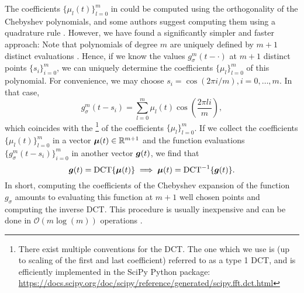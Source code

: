 The coefficients $\{\mu_l(t)\}_{l=0}^m$ in 
could be computed using the
orthogonality of the Chebyshev polynomials, and some authors suggest computing
them using a quadrature rule \cite[Algorithm~1]{lin2017randomized}. However, we
have found a significantly simpler and faster approach: Note that polynomials of
degree $m$ are uniquely defined by $m+1$ distinct evaluations \cite{gauss1799demonstratio}.
Hence, if we know the values $g_{\sigma}^m(t - \cdot)$ at $m+1$ distinct points 
$\{s_i\}_{i=0}^m$, we can uniquely determine the coefficients $\{\mu_l\}_{l=0}^m$
of this polynomial. For convenience, we may choose $s_i = \cos(2 \pi i/m), i=0,\dots,m$.
In that case,
\begin{equation}
    g_{\sigma}^m(t - s_i) = \sum_{l=0}^{m} \mu_l(t) \cos\left(\frac{2 \pi l i}{m}\right),
    \label{equ:2-chebyshev-chebyshev-nodes-evaluation}
\end{equation}
which coincides with the \footnote{There exist multiple conventions for the DCT.
The one which we use is (up to scaling of the first and last coefficient)
referred to as a type 1 DCT, and is efficiently implemented in the SciPy Python package:
\url{https://docs.scipy.org/doc/scipy/reference/generated/scipy.fft.dct.html}} of the coefficients $\{\mu_l\}_{l=0}^m$.
If we collect the coefficients $\{\mu_l(t)\}_{l=0}^{m}$ in a vector $\boldsymbol{\mu}(t) \in \mathbb{R}^{m+1}$ 
and the function evaluations $\{g_{\sigma}^m(t - s_i)\}_{i=0}^{m}$ in another
vector $\boldsymbol{g}(t)$, we find that
\begin{equation}
    \boldsymbol{g}(t) = \operatorname{DCT} \{ \boldsymbol{\mu}(t) \} \implies \boldsymbol{\mu}(t) = \operatorname{DCT}^{-1}\{ \boldsymbol{g}(t) \}.
    \label{equ:2-chebyshev-chebyshev-DCT}
\end{equation}
In short, computing the coefficients of the Chebyshev expansion 
of the function $g_{\sigma}$ amounts to evaluating this function at $m+1$ well
chosen points and computing the inverse \gls{DCT}.
This procedure is usually inexpensive and can be done in $\mathcal{O}(m \log(m))$
operations \cite{makhoul1980fct}.\\

